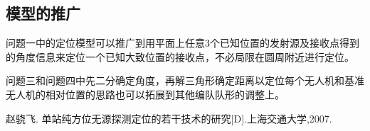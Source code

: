 \documentclass{ctexart}
\begin{document}
\subsection{模型的推广}
    问题一中的定位模型可以推广到用平面上任意3个已知位置的发射源及接收点得到的角度信息来定位一个已知大致位置的接收点，不必局限在圆周附近进行定位。

    问题三和问题四中先二分确定角度，再解三角形确定距离以定位每个无人机和基准无人机的相对位置的思路也可以拓展到其他编队队形的调整上。

    

\begin{thebibliography}{100}%
   赵骁飞. 单站纯方位无源探测定位的若干技术的研究[D].上海交通大学,2007.
\end{thebibliography}
\end{document}
